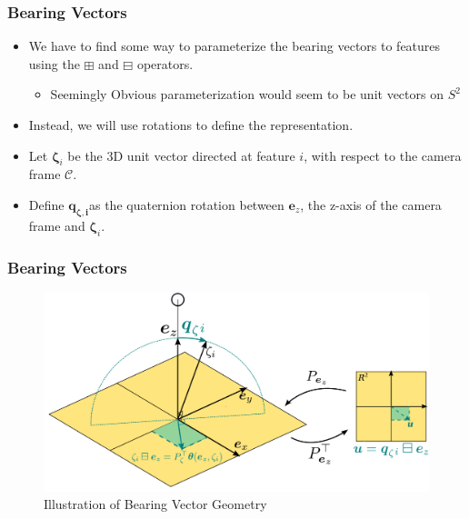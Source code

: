 \documentclass{beamer}
\begin{document}
\begin{frame}
\frametitle{Bearing Vectors}
\begin{itemize}
	\item We have to find some way to parameterize the bearing vectors to features
using the $\boxplus$ and $\boxminus$ operators. 
\begin{itemize}
	\item Seemingly Obvious parameterization would seem to be unit vectors on $S^{2}$
\end{itemize}
\item Instead, we will use rotations to define the representation. 
\item Let $\boldsymbol{\zeta}_{i}$
be the 3D unit vector directed at feature $i$, with respect to the
camera frame $\mathcal{C}$. 
\item Define $\boldsymbol{q}_{\boldsymbol{\zeta,i}}$as
the quaternion rotation between $\boldsymbol{e}_{z}$, the z-axis
of the camera frame and $\boldsymbol{\zeta}_{i}$.
\end{itemize}
\end{frame}

\begin{frame}
\frametitle{Bearing Vectors}
\begin{figure}
\begin{centering}
\includegraphics[width=\columnwidth]{figures/unit_vector_picture}
\par\end{centering}
\caption{Illustration of Bearing Vector Geometry}
\end{figure}
\end{frame}
\end{document}
